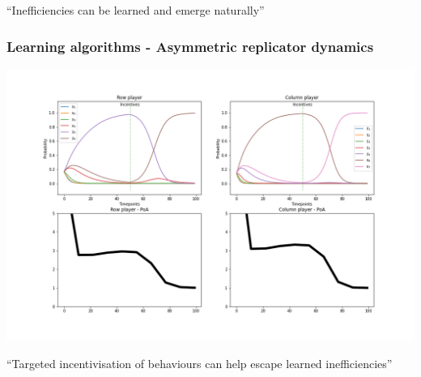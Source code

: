 \begin{frame}
    \centering
    \Huge{
    ``Inefficiencies can be learned and emerge naturally''
    }
\end{frame}


\begin{frame}
    \frametitle{Learning algorithms - Asymmetric replicator dynamics}

    \includegraphics[scale=0.28]{Bin/ARD_penalty_game.png}
    
\end{frame}


\begin{frame}
    \centering
    \Huge{
    ``Targeted incentivisation of behaviours can help escape learned inefficiencies''
    }
\end{frame}

